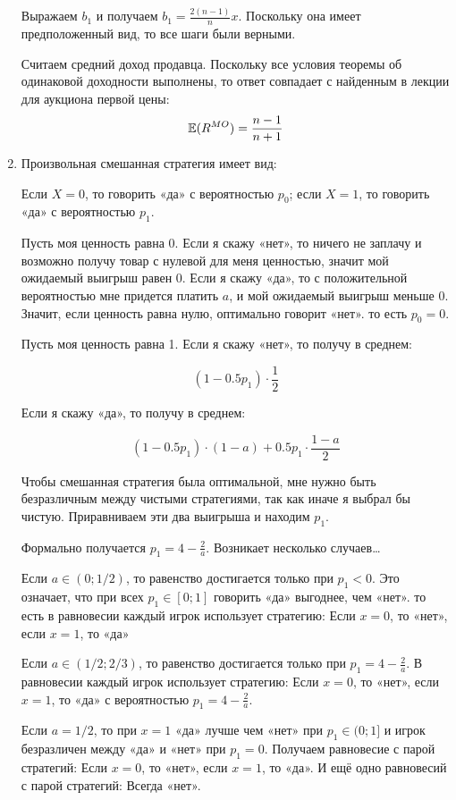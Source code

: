 \begin{enumerate}
Выражаем $ b_{1} $ и получаем $ b_{1}=\frac{2(n-1)}{n}x $. Поскольку она имеет предположенный вид, то все шаги были верными.


Считаем средний доход продавца. Поскольку все условия теоремы об одинаковой доходности выполнены, то ответ совпадает с найденным в лекции для аукциона первой цены:
\begin{equation}
 \mathbb{E}(R^{MO})=\frac{n-1}{n+1}
\end{equation}


\item
Произвольная смешанная стратегия имеет вид:

Если $ X=0 $, то говорить «да» с вероятностью $ p_{0} $; если $ X=1 $, то говорить «да» с вероятностью $ p_{1} $.

Пусть моя ценность равна 0. Если я скажу «нет», то ничего не заплачу и возможно получу товар с нулевой для меня ценностью, значит мой ожидаемый выигрыш равен 0. Если я скажу «да», то с положительной вероятностью мне придется платить $ a $, и мой ожидаемый выигрыш меньше 0. Значит, если ценность равна нулю, оптимально говорит  «нет». то есть $ p_{0}=0 $.

Пусть моя ценность равна 1. Если я скажу «нет», то получу в среднем:

\begin{equation}
(1-0.5p_{1})\cdot \frac{1}{2}
\end{equation}


Если я скажу «да», то получу в среднем:

\begin{equation}
(1-0.5p_{1})\cdot (1-a)+0.5p_{1}\cdot \frac{1-a}{2}
\end{equation}

Чтобы смешанная стратегия была оптимальной, мне нужно быть безразличным между чистыми стратегиями, так как иначе я выбрал бы чистую. Приравниваем эти два выигрыша и находим $ p_{1} $.

Формально получается $ p_{1}=4-\frac{2}{a}$. Возникает несколько случаев\ldots

Если $ a\in (0;1/2) $, то равенство достигается только при $ p_{1}<0 $. Это означает, что при всех $ p_{1}\in [0;1] $ говорить «да» выгоднее, чем «нет». то есть в равновесии каждый игрок использует стратегию: Если $ x=0 $, то «нет», если $ x=1 $, то «да»

Если $ a\in (1/2;2/3) $, то равенство достигается только при $ p_{1}=4-\frac{2}{a} $. В равновесии каждый игрок использует стратегию: Если $ x=0 $, то «нет», если $ x=1 $, то «да» с вероятностью $ p_{1}=4-\frac{2}{a}  $.

Если $ a=1/2 $, то при $ x=1 $ «да» лучше чем «нет» при $ p_{1}\in (0;1] $ и игрок безразличен между «да» и «нет» при $ p_{1}=0 $. Получаем равновесие с парой стратегий: Если $ x=0 $, то «нет», если $ x=1 $, то «да». И ещё одно равновесий с парой стратегий: Всегда «нет».

\end{enumerate}
